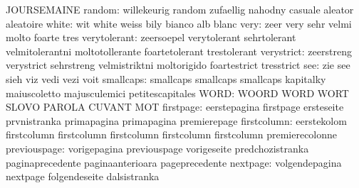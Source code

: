                            JOURSEMAINE
                   random: willekeurig               random
                           zufaellig                 nahodny
                           casuale                   aleator
                           aleatoire
                    white: wit                       white
                           weiss                     bily
                           bianco                    alb
                           blanc
                     very: zeer                      very
                           sehr                      velmi
                           molto                     foarte
                           tres
             verytolerant: zeersoepel                verytolerant
                           sehrtolerant              velmitolerantni
                           moltotollerante           foartetolerant
                           trestolerant
               verystrict: zeerstreng                verystrict
                           sehrstreng                velmistriktni
                           moltorigido               foartestrict
                           tresstrict
                      see: zie                       see
                           sieh                      viz
                           vedi                      vezi
                           voit
                smallcaps: smallcaps                 smallcaps
                           smallcaps                 kapitalky
                           maiuscoletto              majusculemici
                           petitescapitales
                     WORD: WOORD                     WORD
                           WORT                      SLOVO
                           PAROLA                    CUVANT
                           MOT
                firstpage: eerstepagina              firstpage
                           ersteseite                prvnistranka
                           primapagina               primapagina
                           premierepage
              firstcolumn: eerstekolom               firstcolumn
                           firstcolumn               firstcolumn
                           firstcolumn               firstcolumn
                           premierecolonne
             previouspage: vorigepagina              previouspage
                           vorigeseite               predchozistranka
                           paginaprecedente          paginaanterioara
                           pageprecedente
                 nextpage: volgendepagina            nextpage
                           folgendeseite             dalsistranka
